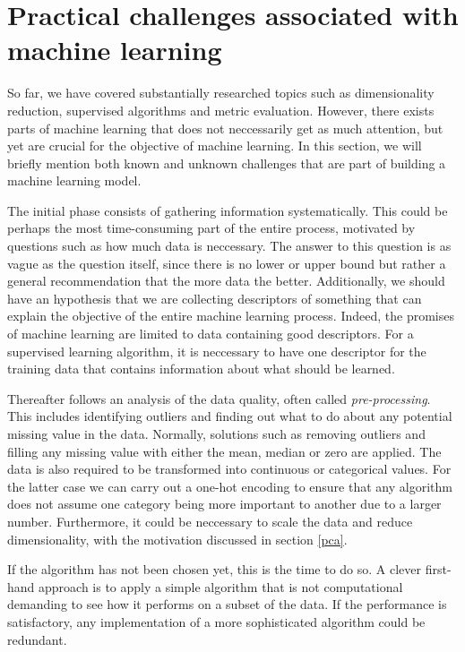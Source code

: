 \section{Practical challenges associated with machine learning}

So far, we have covered substantially researched topics such as dimensionality reduction, supervised algorithms and metric evaluation. However, there exists parts of machine learning that does not neccessarily get as much attention, but yet are crucial for the objective of machine learning. In this section, we will briefly mention both known and unknown challenges that are part of building a machine learning model.

The initial phase consists of gathering information systematically. This could be perhaps the most time-consuming part of the entire process, motivated by questions such as how much data is neccessary. The answer to this question is as vague as the question itself, since there is no lower or upper bound but rather a general recommendation that the more data the better. Additionally, we should have an hypothesis that we are collecting descriptors of something that can explain the objective of the entire machine learning process. Indeed, the promises of machine learning are limited to data containing good descriptors. For a supervised learning algorithm, it is neccessary to have one descriptor for the training data that contains information about what should be learned.

Thereafter follows an analysis of the data quality, often called \textit{pre-processing}. This includes identifying outliers and finding out what to do about any potential missing value in the data. Normally, solutions such as removing outliers and filling any missing value with either the mean, median or zero are applied. The data is also required to be transformed into continuous or categorical values. For the latter case we can carry out a one-hot encoding to ensure that any algorithm does not assume one category being more important to another due to a larger number. Furthermore, it could be neccessary to scale the data and reduce dimensionality, with the motivation discussed in section \ref{pca}.

If the algorithm has not been chosen yet, this is the time to do so. A clever first-hand approach is to apply a simple algorithm that is not computational demanding to see how it performs on a subset of the data. If the performance is satisfactory, any implementation of a more sophisticated algorithm could be redundant.

